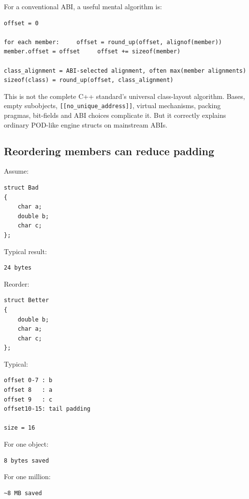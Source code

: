 For a conventional ABI, a useful mental algorithm is:

\begin{verbatim}
offset = 0

for each member:     offset = round_up(offset, alignof(member))     member.offset = offset     offset += sizeof(member)

class_alignment = ABI-selected alignment, often max(member alignments)
sizeof(class) = round_up(offset, class_alignment)
\end{verbatim}

This is not the complete C++ standard's universal class-layout algorithm. Bases, empty subobjects, \texttt{{[}{[}no\_unique\_address{]}{]}}, virtual mechanisms, packing pragmas, bit-fields and ABI choices complicate it. But it correctly explains ordinary POD-like engine structs on mainstream ABIs.

\subsection{Reordering members can reduce padding}\label{05-engine-i-ch003-reordering-members-can-reduce-padding}

Assume:

\begin{verbatim}
struct Bad
{
    char a;
    double b;
    char c;
};
\end{verbatim}

Typical result:

\begin{verbatim}
24 bytes
\end{verbatim}

Reorder:

\begin{verbatim}
struct Better
{
    double b;
    char a;
    char c;
};
\end{verbatim}

Typical:

\begin{verbatim}
offset 0-7 : b
offset 8   : a
offset 9   : c
offset10-15: tail padding

size = 16
\end{verbatim}

For one object:

\begin{verbatim}
8 bytes saved
\end{verbatim}

For one million:

\begin{verbatim}
~8 MB saved
\end{verbatim}

